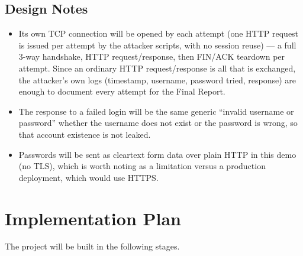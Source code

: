 \documentclass[11pt]{article}
\begin{document}
\subsection{Design Notes}

\begin{itemize}[leftmargin=*]
  \item Its own TCP connection will be opened by each attempt (one HTTP request is
    issued per attempt by the attacker scripts, with no session reuse) --- a full
    3-way handshake, HTTP request/response, then FIN/ACK teardown per attempt. Since
    an ordinary HTTP request/response is all that is exchanged, the attacker's own
    logs (timestamp, username, password tried, response) are enough to document
    every attempt for the Final Report.
  \item The response to a failed login will be the same generic ``invalid username or
    password'' whether the username does not exist or the password is wrong, so that
    account existence is not leaked.
  \item Passwords will be sent as cleartext form data over plain HTTP in this demo
    (no TLS), which is worth noting as a limitation versus a production deployment,
    which would use HTTPS.
\end{itemize}

\section{Implementation Plan}

The project will be built in the following stages.
\end{document}
